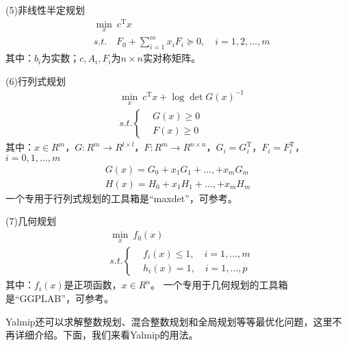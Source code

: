     \par
    (5)非线性半定规划
    \begin{align*}
    &\min_x \ c^\mathrm{T}x\\
    &s.t. \quad F_0 + \sum_{i = 1}^mx_iF_i \succeq 0,\quad i = 1,2,\dots,m
    \end{align*}
    其中：$b_i$为实数；$c,A_i,F_i$为$n\times n$实对称矩阵。
    \par
    (6)行列式规划
   \begin{align*}
    &\min_x \ c ^\mathrm{T} x + \log \det G(x)^{-1}\\
    &s.t.\left\{
    \begin{aligned}
    &G(x) \geqslant 0\\
    &F(x) \geqslant 0
    \end{aligned}
    \right.
    \end{align*}
    其中：$x\in R^m$，$G:R^m \rightarrow R^{l\times l}$，$F:R^m\rightarrow R^{n\times n}$，$G_i = G_i^\mathrm{T}$，$F_i = F_i^\mathrm{T}$，$i = 0,1,\dots,m$
    \begin{align*}
    G(x) = G_0 + x_1G_1 + \dots,+x_mG_m\\
    H(x) = H_0 + x_1H_1 + \dots,+x_mH_m
    \end{align*}
    一个专用于行列式规划的工具箱是“maxdet”，可参考\cite{Maxdetguide}。
    \par
    (7)几何规划
    \begin{align*}
    &\min_x \ f_0(x)\\
    &s.t.\left\{
    \begin{aligned}
    &f_i(x) \leqslant 1,\quad i = 1,\dots,m\\
    &h_i(x) = 1,\quad i = 1,\dots,p
    \end{aligned}
    \right.
    \end{align*}
    其中：$f_i(x)$是正项函数，$x\in R^n$。
    一个专用于几何规划的工具箱是“GGPLAB”，可参考\cite{GGPLAB}。
    \par
    Yalmip还可以求解整数规划、混合整数规划和全局规划等等最优化问题，这里不再详细介绍。下面，我们来看Yalmip的用法。
